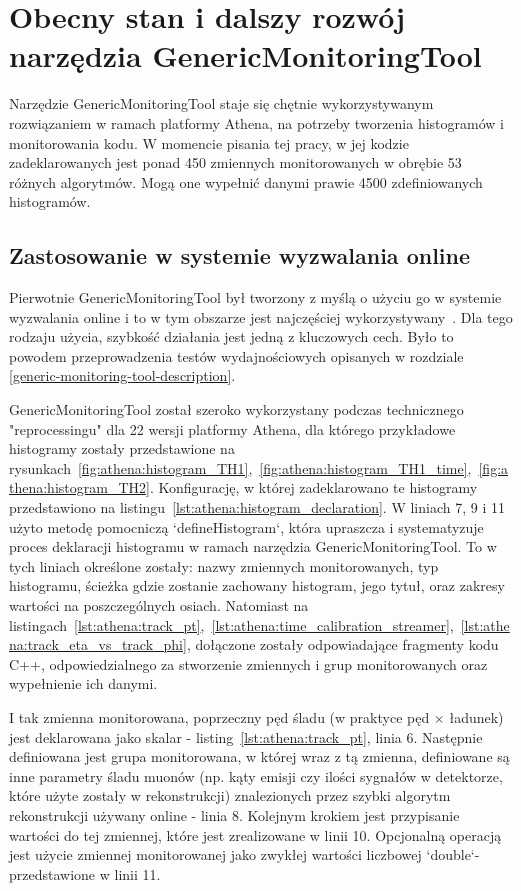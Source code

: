 \section{Obecny stan i dalszy rozwój narzędzia GenericMonitoringTool}
Narzędzie GenericMonitoringTool staje się chętnie wykorzystywanym rozwiązaniem w ramach platformy Athena, na potrzeby tworzenia histogramów i monitorowania kodu.
W momencie pisania tej pracy, w jej kodzie zadeklarowanych jest ponad 450 zmiennych monitorowanych w obrębie 53 różnych algorytmów. 
Mogą one wypełnić danymi prawie 4500 zdefiniowanych histogramów.

\subsection{Zastosowanie w systemie wyzwalania online}
Pierwotnie GenericMonitoringTool był tworzony z myślą o użyciu go w systemie wyzwalania online i to w tym obszarze jest najczęściej wykorzystywany~\cite{online-monitoring-guide}. 
Dla tego rodzaju użycia, szybkość działania jest jedną z kluczowych cech. 
Było to powodem przeprowadzenia testów wydajnościowych opisanych w rozdziale \ref{generic-monitoring-tool-description}.

GenericMonitoringTool został szeroko wykorzystany podczas technicznego "reprocessingu" dla 22 wersji platformy Athena, dla którego przykładowe histogramy zostały przedstawione na rysunkach~\ref{fig:athena:histogram_TH1},~\ref{fig:athena:histogram_TH1_time},~\ref{fig:athena:histogram_TH2}.
Konfigurację, w której zadeklarowano te histogramy przedstawiono na listingu~\ref{lst:athena:histogram_declaration}. W liniach 7, 9 i 11 użyto metodę pomocniczą `defineHistogram`, która upraszcza i systematyzuje proces deklaracji histogramu w ramach narzędzia GenericMonitoringTool. To w tych liniach określone zostały: nazwy zmiennych monitorowanych, typ histogramu, ścieżka gdzie zostanie zachowany histogram, jego tytuł, oraz zakresy wartości na poszczególnych osiach.
Natomiast na listingach~\ref{lst:athena:track_pt},~\ref{lst:athena:time_calibration_streamer},~\ref{lst:athena:track_eta_vs_track_phi}, dołączone zostały odpowiadające fragmenty kodu C++, odpowiedzialnego za stworzenie zmiennych i grup monitorowanych oraz wypełnienie ich danymi.

I tak zmienna monitorowana, poprzeczny pęd śladu (w praktyce pęd $\times$ ładunek) jest deklarowana jako skalar - listing~\ref{lst:athena:track_pt}, linia 6. 
Następnie definiowana jest grupa monitorowana, w której wraz z tą zmienna, definiowane są inne parametry śladu muonów (np. kąty emisji czy ilości sygnałów w detektorze, które użyte zostały w rekonstrukcji) znalezionych przez szybki algorytm rekonstrukcji używany online - linia 8. 
Kolejnym krokiem jest przypisanie wartości do tej zmiennej, które jest zrealizowane w linii 10.
Opcjonalną operacją jest użycie zmiennej monitorowanej jako zwykłej wartości liczbowej `double`- przedstawione w linii 11.

